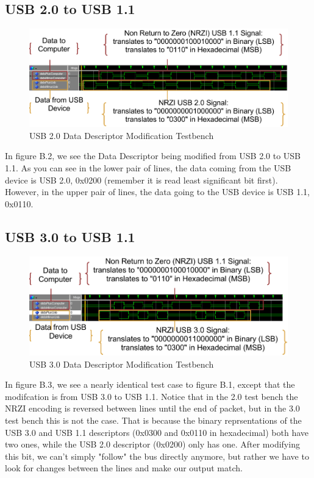 \documentclass[12pt,letter,oneside]{report}
\begin{document}
\subsection{USB 2.0 to USB 1.1}
\begin{figure}[h!]
	\centering
	\caption{USB 2.0 Data Descriptor Modification Testbench}
	\includegraphics[width=.98\textwidth]{usb2}
\end{figure}
In figure B.2, we see the Data Descriptor being modified from USB 2.0 to USB 1.1. As you can see in the lower pair of lines, the data coming from the USB device is USB 2.0, 0x0200 (remember it is read least significant bit first). However, in the upper pair of lines, the data going to the USB device is USB 1.1, 0x0110.
\pagebreak
\subsection{USB 3.0 to USB 1.1}
\begin{figure}[h!]
	\centering
	\caption{USB 3.0 Data Descriptor Modification Testbench}
	\includegraphics[width=.98\textwidth]{usb3}
\end{figure}
In figure B.3, we see a nearly identical test case to figure B.1, except that the modifcation is from USB 3.0 to USB 1.1. Notice that in the 2.0 test bench the NRZI encoding is reversed between lines until the end of packet, but in the 3.0 test bench this is not the case. That is because the binary reprsentations of the USB 3.0 and USB 1.1 descriptors (0x0300 and 0x0110 in hexadecimal) both have two ones, while the USB 2.0 descriptor (0x0200) only has one. After modifying this bit, we can't simply "follow" the bus directly anymore, but rather we have to look for changes between the lines and make our output match.
\pagebreak
\end{document}
